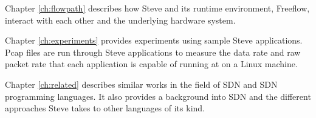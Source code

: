 Chapter \ref{ch:flowpath} describes how Steve and its runtime environment, Freeflow,
interact with each other and the underlying hardware system.

Chapter \ref{ch:experiments} provides experiments using sample Steve
applications. Pcap files are run through Steve applications to measure the data
rate and raw packet rate that each application is capable of running at on a
Linux machine.

Chapter \ref{ch:related} describes similar
works in the field of SDN and SDN programming languages. It also provides a
background into SDN and the different approaches Steve takes to other languages
of its kind.
